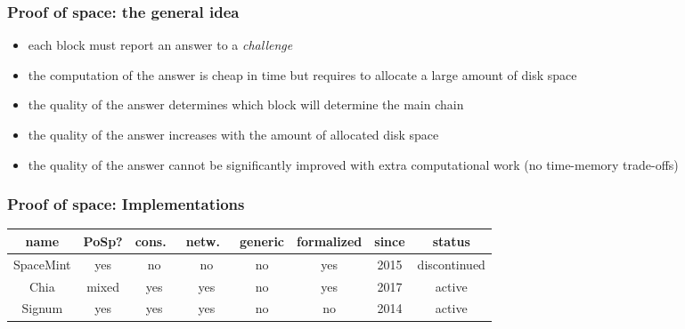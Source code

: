 \documentclass[11pt]{beamer}  %
\begin{document}
\begin{frame}\frametitle{Proof of space: the general idea}

  \begin{itemize}
  \item each block must report an answer to a \emph{challenge}
  \item the computation of the answer is cheap in time but requires to allocate a large amount of disk space
  \item the quality of the answer determines which block will determine the main chain
  \item the quality of the answer increases with the amount of allocated disk space
  \item the quality of the answer cannot be significantly improved with extra computational work (no time-memory trade-offs)
  \end{itemize}
  
\end{frame}

\begin{frame}\frametitle{Proof of space: Implementations}

  \begin{center}
    {\small\begin{tabular}{c|c|c|c|c|c|c|c}
      name & PoSp? & cons.\ & netw.\ & generic & formalized & since & status \\\hline\hline
      SpaceMint & yes & no & no & no & yes & 2015 & discontinued\\\hline
      Chia & mixed & yes & yes & no & yes & 2017 & active\\\hline
      Signum & yes & yes & yes & no & no & 2014 & active\\\hline
    \end{tabular}}
  \end{center}
  
\end{frame}
\end{document}
